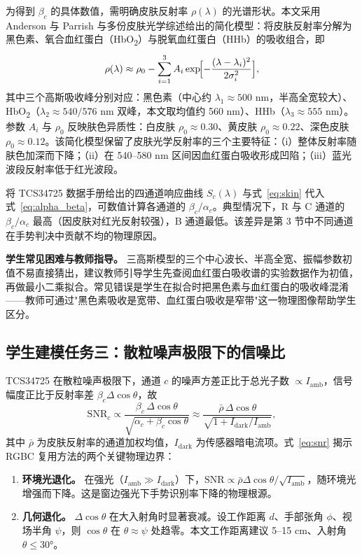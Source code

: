 \documentclass[11pt,a4paper]{ctexart}
\begin{document}
为得到 $\beta_c$ 的具体数值，需明确皮肤反射率 $\rho(\lambda)$ 的光谱形状。本文采用 Anderson 与 Parrish\citep{andersonparrish1981} 与多份皮肤光学综述给出的简化模型：将皮肤反射率分解为黑色素、氧合血红蛋白（HbO\textsubscript{2}）与脱氧血红蛋白（HHb）的吸收组合，即
\begin{equation}
\rho(\lambda)\approx\rho_0-\sum_{i=1}^{3} A_i\exp\!\Bigl[-\frac{(\lambda-\lambda_i)^2}{2\sigma_i^2}\Bigr],
\label{eq:skin}
\end{equation}
其中三个高斯吸收峰分别对应：黑色素（中心约 $\lambda_1\approx 500$ nm，半高全宽较大）、HbO\textsubscript{2}（$\lambda_2\approx 540/576$ nm 双峰，本文取均值约 560 nm）、HHb（$\lambda_3\approx 555$ nm）。参数 $A_i$ 与 $\rho_0$ 反映肤色异质性：白皮肤 $\rho_0\approx 0.30$、黄皮肤 $\rho_0\approx 0.22$、深色皮肤 $\rho_0\approx 0.12$。该简化模型保留了皮肤光学反射率的三个主要特征：（i）整体反射率随肤色加深而下降；（ii）在 540--580 nm 区间因血红蛋白吸收形成凹陷；（iii）蓝光波段反射率低于红光波段。

将 TCS34725 数据手册给出的四通道响应曲线 $S_c(\lambda)$ 与式~\eqref{eq:skin} 代入式~\eqref{eq:alpha_beta}，可数值计算各通道的 $\beta_c/\alpha_c$。典型情况下，R 与 C 通道的 $\beta_c/\alpha_c$ 最高（因皮肤对红光反射较强），B 通道最低。该差异是第 3 节中不同通道在手势判决中贡献不均的物理原因。

\textbf{学生常见困难与教师指导。} 三高斯模型的三个中心波长、半高全宽、振幅参数初值不易直接猜出，建议教师引导学生先查阅血红蛋白吸收谱的实验数据作为初值，再做最小二乘拟合。常见错误是学生在拟合时把黑色素与血红蛋白的吸收峰混淆——教师可通过"黑色素吸收是宽带、血红蛋白吸收是窄带"这一物理图像帮助学生区分。

\subsection{学生建模任务三：散粒噪声极限下的信噪比}
\label{sec:task3}

TCS34725 在散粒噪声极限下，通道 $c$ 的噪声方差正比于总光子数 $\propto I_{\mathrm{amb}}$，信号幅度正比于反射率差 $\beta_c\Delta\cos\theta$，故
\begin{equation}
\mathrm{SNR}_c\propto\frac{\beta_c\,\Delta\cos\theta}{\sqrt{\alpha_c+\beta_c\cos\theta}}\approx\frac{\bar{\rho}\,\Delta\cos\theta}{\sqrt{1+I_{\mathrm{dark}}/I_{\mathrm{amb}}}},
\label{eq:snr}
\end{equation}
其中 $\bar{\rho}$ 为皮肤反射率的通道加权均值，$I_{\mathrm{dark}}$ 为传感器暗电流项。式~\eqref{eq:snr} 揭示 RGBC 复用方法的两个关键物理边界：
\begin{enumerate}[label=(\arabic*),leftmargin=2.2em]
  \item \textbf{环境光退化。} 在强光（$I_{\mathrm{amb}}\gg I_{\mathrm{dark}}$）下，$\mathrm{SNR}\propto\bar{\rho}\Delta\cos\theta/\sqrt{I_{\mathrm{amb}}}$，随环境光增强而下降。这是窗边强光下手势识别率下降的物理根源。
  \item \textbf{几何退化。} $\Delta\cos\theta$ 在大入射角时显著衰减。设工作距离 $d$、手部张角 $\phi$、视场半角 $\psi$，则 $\cos\theta$ 在 $\theta\approx\psi$ 处趋零。本文工作距离建议 5--15 cm、入射角 $\theta\le 30°$。
\end{enumerate}
\end{document}
